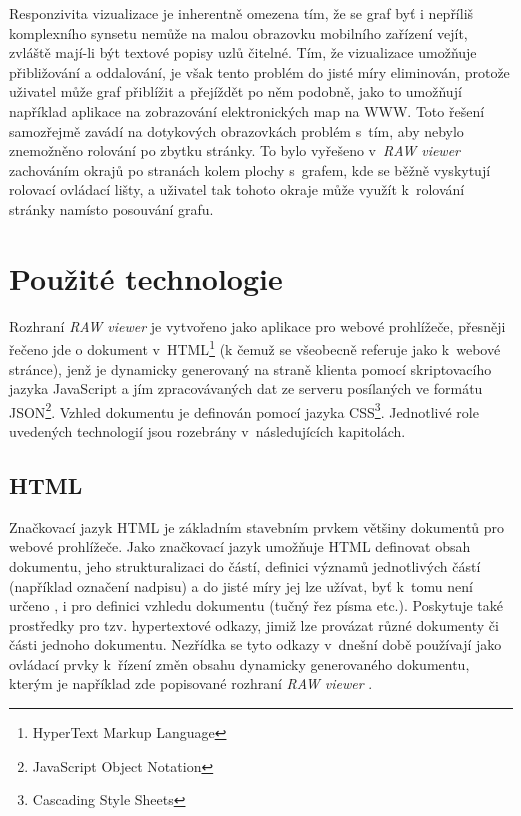 \documentclass[a4paper, 11pt, oneside, showtrims]{book}
\newcommand{\simplywn}{\textit{RAW viewer} }
\begin{document}
				Responzivita vizualizace je inherentně omezena tím, že se graf byť i nepříliš komplexního synsetu nemůže na malou obrazovku mobilního zařízení vejít, zvláště mají-li být textové popisy uzlů čitelné. Tím, že vizualizace umožňuje přibližování a oddalování, je však tento problém do jisté míry eliminován, protože uživatel může graf přiblížit a přejíždět po něm podobně, jako to umožňují například aplikace na zobrazování elektronických map na WWW. Toto řešení samozřejmě zavádí na dotykových obrazovkách problém s~tím, aby nebylo znemožněno rolování po zbytku stránky. To bylo vyřešeno v~\simplywn zachováním okrajů po stranách kolem plochy s~grafem, kde se běžně vyskytují rolovací ovládací lišty, a uživatel tak tohoto okraje může využít k~rolování stránky namísto posouvání grafu.


		\chapter{Použité technologie}
		\label{cha:techno}

			Rozhraní \simplywn je vytvořeno jako aplikace pro webové prohlížeče, přesněji řečeno jde o dokument v~HTML\footnote{HyperText Markup Language} (k čemuž se všeobecně referuje jako k~webové stránce), jenž je dynamicky generovaný na straně klienta pomocí skriptovacího jazyka JavaScript a jím zpracovávaných dat ze serveru posílaných ve formátu JSON\footnote{JavaScript Object Notation}. Vzhled dokumentu je definován pomocí jazyka CSS\footnote{Cascading Style Sheets}. Jednotlivé role uvedených technologií jsou rozebrány v~následujících kapitolách.

			\section{HTML}

				Značkovací jazyk HTML je základním stavebním prvkem většiny dokumentů pro webové prohlížeče. Jako značkovací jazyk umožňuje HTML definovat obsah dokumentu, jeho strukturalizaci do částí, definici významů jednotlivých částí (například označení nadpisu) a do jisté míry jej lze užívat, byť k~tomu není určeno \parencite{cssWeb}, i pro definici vzhledu dokumentu (tučný řez písma etc.). Poskytuje také prostředky pro tzv. hypertextové odkazy, jimiž lze provázat různé dokumenty či části jednoho dokumentu. Nezřídka se tyto odkazy v~dnešní době používají jako ovládací prvky k~řízení změn obsahu dynamicky generovaného dokumentu, kterým je například zde popisované rozhraní \simplywn. 
\end{document}

